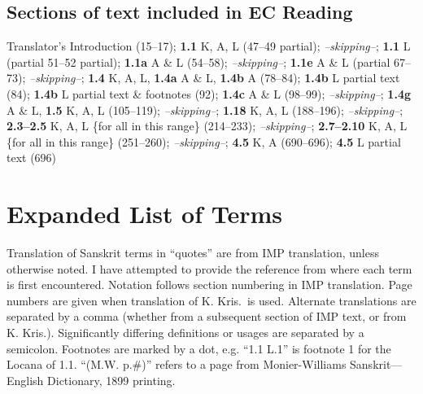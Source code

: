 \documentclass[10pt]{article}
\begin{document}
\subsection{Sections of text included in EC Reading}

Translator's Introduction (15--17);
\textbf{1.1} K, A, L (47--49 partial);
\textit{--skipping--};
\textbf{1.1} L (partial 51--52 partial);
\textbf{1.1a} A \& L (54--58);
\textit{--skipping--};
\textbf{1.1e} A \& L (partial 67--73);
\textit{--skipping--};
\textbf{1.4} K, A, L, \textbf{1.4a} A \& L, \textbf{1.4b} A (78--84);
\textbf{1.4b} L partial text (84);
\textbf{1.4b} L partial text \& footnotes (92);
\textbf{1.4c} A \& L (98--99);
\textit{--skipping--};
\textbf{1.4g} A \& L, \textbf{1.5} K, A, L (105--119);
\textit{--skipping--};
\textbf{1.18} K, A, L (188--196);
\textit{--skipping--};
\textbf{2.3--2.5} K, A, L \{for all in this range\} (214--233);
\textit{--skipping--};
\textbf{2.7--2.10} K, A, L \{for all in this range\} (251--260);
\textit{--skipping--};
\textbf{4.5} K, A (690--696);
\textbf{4.5} L partial text (696)



\newpage


\section{Expanded List of Terms}

Translation of Sanskrit terms in ``quotes'' are from IMP translation, unless otherwise noted.
I have attempted to provide the reference from where each term is first encountered.
Notation follows section numbering in IMP translation. Page numbers are given when translation of K. Kris.\ is used.
Alternate translations are separated by a comma (whether from a subsequent section of IMP text, or from K. Kris.).
Significantly differing definitions or usages are separated by a semicolon.
Footnotes are marked by a dot, e.g. ``1.1 L.1'' is footnote 1 for the Locana of 1.1.
``(M.W. p.\#)'' refers to a page from Monier-Williams Sanskrit---English Dictionary, 1899 printing.
\end{document}
